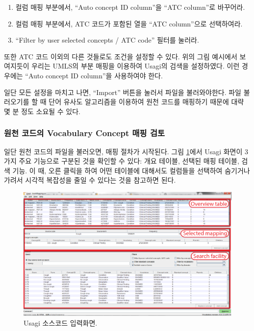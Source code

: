 \documentclass[11pt]{book}
\providecommand{\tightlist}{%
  \setlength{\itemsep}{0pt}\setlength{\parskip}{0pt}}
\theoremstyle{definition}
\theoremstyle{definition}
\theoremstyle{definition}
\theoremstyle{remark}
\begin{document}
\begin{enumerate}
\def\labelenumi{\arabic{enumi}.}
\tightlist
\item
  컬럼 매핑 부분에서, ``Auto concept ID column''을 ``ATC column''로
  바꾸어라.
\item
  컬럼 매핑 부분에서, ATC 코드가 포함된 열을 ``ATC column''으로
  선택하여라.
\item
  ``Filter by user selected concepts / ATC code'' 필터를 눌러라.
\end{enumerate}

또한 ATC 코드 이외의 다른 것들로도 조건을 설정할 수 있다. 위의 그림
예시에서 보여지듯이 우리는 UMLS의 부분 매핑을 이용하여 Usagi의 검색을
설정하였다. 이런 경우에는 ``Auto concept ID column''을 사용하여야 한다.

일단 모든 설정을 마치고 나면, ``Import'' 버튼을 눌러서 파일을
불러와야한다. 파일 불러오기를 할 때 단어 유사도 알고리즘을 이용하여 원천
코드를 매핑하기 때문에 대략 몇 분 정도 소요될 수 있다.

\subsubsection*{원천 코드의 Vocabulary Concept 매핑
검토}\label{--vocabulary-concept--}

일단 원천 코드의 파일을 불러오면, 매핑 절차가 시작된다. 그림
\ref{fig:usagiOverview}에서 Usagi 화면이 3가지 주요 기능으로 구분된 것을
확인할 수 있다: 개요 테이블, 선택된 매핑 테이블, 검색 기능. 이 때, 오른
클릭을 하여 어떤 테이블에 대해서도 컬럼들을 선택하여 숨기거나 가려서
시각적 복잡성을 줄일 수 있다는 것을 참고하면 된다.

\begin{figure}

{\centering \includegraphics[width=1\linewidth]{images/ExtractTransformLoad/usagiOverview} 

}

\caption{Usagi 소스코드 입력화면.}\label{fig:usagiOverview}
\end{figure}
\end{document}

